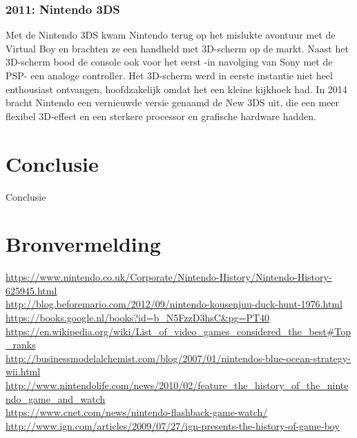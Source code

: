 \documentclass{article}
\begin{document}
\subsubsection{2011: Nintendo 3DS}
Met de Nintendo 3DS kwam Nintendo terug op het mislukte avontuur met de Virtual Boy en brachten ze een handheld met 3D-scherm op de markt. Naast het 3D-scherm bood de console ook voor het eerst -in navolging van Sony met de PSP- een analoge controller. Het 3D-scherm werd in eerste instantie niet heel enthousiast ontvangen, hoofdzakelijk omdat het een kleine kijkhoek had. In 2014 bracht Nintendo een vernieuwde versie genaamd de New 3DS uit, die een meer flexibel 3D-effect en een sterkere processor en grafische hardware hadden.

\section{Conclusie}
Conclusie
\section{Bronvermelding}
\url{https://www.nintendo.co.uk/Corporate/Nintendo-History/Nintendo-History-625945.html}\\ 
\url{http://blog.beforemario.com/2012/09/nintendo-kousenjuu-duck-hunt-1976.html}\\ 
\url{https://books.google.nl/books?id=b_N5FzzD3hsC&pg=PT40}\\ 
\url{https://en.wikipedia.org/wiki/List_of_video_games_considered_the_best#Top_ranks}\\ 
\url{http://businessmodelalchemist.com/blog/2007/01/nintendos-blue-ocean-strategy-wii.html}\\ 
\url{http://www.nintendolife.com/news/2010/02/feature_the_history_of_the_nintendo_game_and_watch}\\ 
\url{https://www.cnet.com/news/nintendo-flashback-game-watch/}\\ 
\url{http://www.ign.com/articles/2009/07/27/ign-presents-the-history-of-game-boy}\\ 
\end{document}
